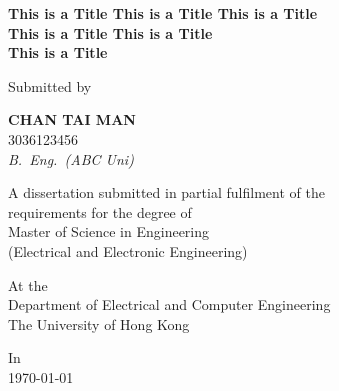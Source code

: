 %
%

\newcommand{\ThesisTitle}{%
  This is a Title This is a Title This is a Title\\
  This is a Title This is a Title\\
  This is a Title%
}
\newcommand{\AuthorName}{CHAN TAI MAN}
\newcommand{\StudentID}{3036123456}
\newcommand{\PreviousDegree}{B.~Eng.~(ABC Uni)}
\newcommand{\DegreeName}{Master of Science in Engineering}
\newcommand{\Specialisation}{(Electrical and Electronic Engineering)}
\newcommand{\Department}{Department of Electrical and Computer Engineering}
\newcommand{\University}{The University of Hong Kong}
\newcommand{\SupervisorName}{Prof. Supervisor Name}

\newcommand{\SubmissionDate}{\monthandyear\today}

\thispagestyle{empty}
\begin{center}
  \vspace*{2cm}

  {\fontsize{20}{26}\selectfont\bfseries \ThesisTitle \par}

  \vspace{1.5cm}
  {\normalsize Submitted by}

  \vspace{0.6cm}
  {\normalsize\bfseries \AuthorName}\\[2pt]
  {\normalsize \StudentID}\\[2pt]
  {\normalsize\itshape \PreviousDegree}

  \vspace{1.5cm}
  {\normalsize
    A dissertation submitted in partial fulfilment of the\\
    requirements for the degree of\\[4pt]
    \DegreeName\\[2pt]
    \Specialisation
  }

  \vspace{0.8cm}
  {\normalsize At the}\\[4pt]
  {\normalsize \Department}\\[2pt]
  {\normalsize \University}

  \vspace{0.8cm}
  {\normalsize In}\\[4pt]
  {\normalsize \SubmissionDate}
\end{center}
\clearpage
